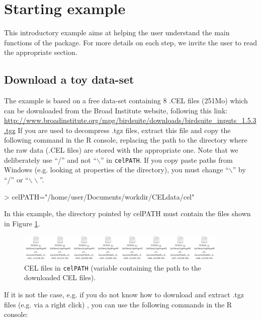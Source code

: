 \documentclass[a4paper,10pt]{article}
\begin{document}
\section{Starting example}

		This introductory example aims at helping the user understand the main functions of the package. For more details on each step, we invite the user to read the appropriate section. 
	
		\subsection{Download a toy data-set}	
	
			The example is based on a free data-set containing 8 .CEL files (251Mo) which can be downloaded from the Broad Institute website, following this link:
			\url{http://www.broadinstitute.org/mpg/birdsuite/downloads/birdsuite_inputs_1.5.3.tgz}
			If you are used to decompress .tgz files, extract this file and copy the following command in the R console, replacing the path to the directory where the raw data (.CEL files) are stored with the appropriate one. Note that we deliberately use ``/'' and not ``$\backslash$'' in \texttt{celPATH}. If you copy paste paths from Windows (e.g. looking at properties of the directory), you must change ``$\backslash$'' by ``/'' or ``$\backslash\backslash$''.
	
\begin{Schunk}
\begin{Sinput}
> celPATH="/home/user/Documents/workdir/CELdata/cel"
\end{Sinput}
\end{Schunk}

In this example, the directory pointed by celPATH must contain the files shown in Figure \ref{dfSingle2}.

			\begin{figure}[!h]
				\centering
				\includegraphics[width=0.9\textwidth]{fig/dataFilesSingle2}
				\caption{CEL files in \texttt{celPATH} (variable containing the path to the downloaded CEL files).}
				\label{dfSingle2}
			\end{figure}
	
			If it is not the case, e.g. if you do not know how to download and extract .tgz files (e.g. via a right click) , you can use the following commands in the R console:
	
\end{document}
